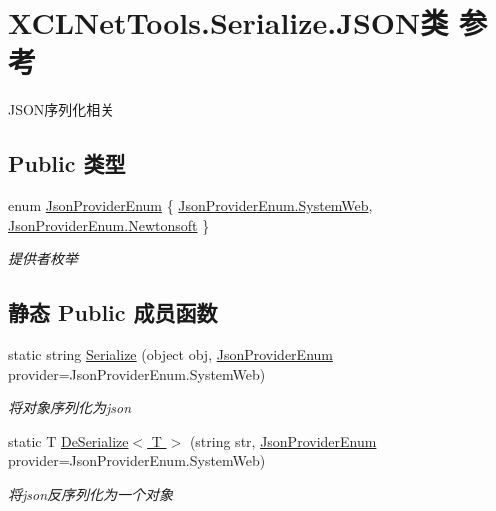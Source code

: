 \hypertarget{class_x_c_l_net_tools_1_1_serialize_1_1_j_s_o_n}{\section{X\-C\-L\-Net\-Tools.\-Serialize.\-J\-S\-O\-N类 参考}
\label{class_x_c_l_net_tools_1_1_serialize_1_1_j_s_o_n}
}


J\-S\-O\-N序列化相关  


\subsection*{Public 类型}
\begin{DoxyCompactItemize}
\item 
enum \hyperlink{class_x_c_l_net_tools_1_1_serialize_1_1_j_s_o_n_acb00f7258e4dedfaa0cec15ce9335a31}{Json\-Provider\-Enum} \{ \hyperlink{class_x_c_l_net_tools_1_1_serialize_1_1_j_s_o_n_acb00f7258e4dedfaa0cec15ce9335a31a67a1b1b70420ea0e3be332a9dedcb83e}{Json\-Provider\-Enum.\-System\-Web}, 
\hyperlink{class_x_c_l_net_tools_1_1_serialize_1_1_j_s_o_n_acb00f7258e4dedfaa0cec15ce9335a31a3dae1400047ce0f8033b4d8f2815fc92}{Json\-Provider\-Enum.\-Newtonsoft}
 \}
\begin{DoxyCompactList}\small\item\em 提供者枚举 \end{DoxyCompactList}\end{DoxyCompactItemize}
\subsection*{静态 Public 成员函数}
\begin{DoxyCompactItemize}
\item 
static string \hyperlink{class_x_c_l_net_tools_1_1_serialize_1_1_j_s_o_n_aa37e98ab010f59d7454506b78ca8902e}{Serialize} (object obj, \hyperlink{class_x_c_l_net_tools_1_1_serialize_1_1_j_s_o_n_acb00f7258e4dedfaa0cec15ce9335a31}{Json\-Provider\-Enum} provider=Json\-Provider\-Enum.\-System\-Web)
\begin{DoxyCompactList}\small\item\em 将对象序列化为json \end{DoxyCompactList}\item 
static T \hyperlink{class_x_c_l_net_tools_1_1_serialize_1_1_j_s_o_n_a9c668a657dca5eb7529d0b7b6e1845a2}{De\-Serialize$<$ T $>$} (string str, \hyperlink{class_x_c_l_net_tools_1_1_serialize_1_1_j_s_o_n_acb00f7258e4dedfaa0cec15ce9335a31}{Json\-Provider\-Enum} provider=Json\-Provider\-Enum.\-System\-Web)
\begin{DoxyCompactList}\small\item\em 将json反序列化为一个对象 \end{DoxyCompactList}\end{DoxyCompactItemize}


